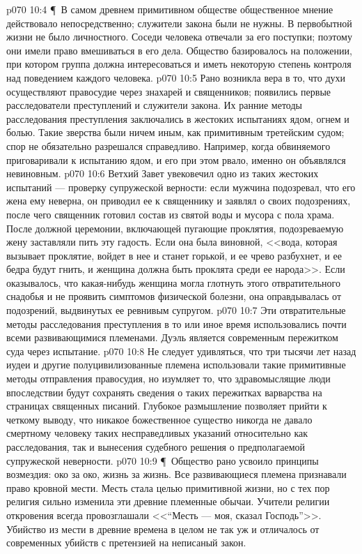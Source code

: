\vs p070 10:4 \P\ В самом древнем примитивном обществе общественное мнение действовало непосредственно; служители закона были не нужны. В первобытной жизни не было личностного. Соседи человека отвечали за его поступки; поэтому они имели право вмешиваться в его дела. Общество базировалось на положении, при котором группа должна интересоваться и иметь некоторую степень контроля над поведением каждого человека.
\vs p070 10:5 Рано возникла вера в то, что духи осуществляют правосудие через знахарей и священников; появились первые расследователи преступлений и служители закона. Их ранние методы расследования преступления заключались в жестоких испытаниях ядом, огнем и болью. Такие зверства были ничем иным, как примитивным третейским судом; спор не обязательно разрешался справедливо. Например, когда обвиняемого приговаривали к испытанию ядом, и его при этом рвало, именно он объявлялся невиновным.
\vs p070 10:6 Ветхий Завет увековечил одно из таких жестоких испытаний --- проверку супружеской верности: если мужчина подозревал, что его жена ему неверна, он приводил ее к священнику и заявлял о своих подозрениях, после чего священник готовил состав из святой воды и мусора с пола храма. После должной церемонии, включающей пугающие проклятия, подозреваемую жену заставляли пить эту гадость. Если она была виновной, <<вода, которая вызывает проклятие, войдет в нее и станет горькой, и ее чрево разбухнет, и ее бедра будут гнить, и женщина должна быть проклята среди ее народа>>. Если оказывалось, что какая\hyp{}нибудь женщина могла глотнуть этого отвратительного снадобья и не проявить симптомов физической болезни, она оправдывалась от подозрений, выдвинутых ее ревнивым супругом.
\vs p070 10:7 Эти отвратительные методы расследования преступления в то или иное время использовались почти всеми развивающимися племенами. Дуэль является современным пережитком суда через испытание.
\vs p070 10:8 Не следует удивляться, что три тысячи лет назад иудеи и другие полуцивилизованные племена использовали такие примитивные методы отправления правосудия, но изумляет то, что здравомыслящие люди впоследствии будут сохранять сведения о таких пережитках варварства на страницах священных писаний. Глубокое размышление позволяет прийти к четкому выводу, что никакое божественное существо никогда не давало смертному человеку таких несправедливых указаний относительно как расследования, так и вынесения судебного решения о предполагаемой супружеской неверности.
\vs p070 10:9 \P\ Общество рано усвоило принципы возмездия: око за око, жизнь за жизнь. Все развивающиеся племена признавали право кровной мести. Месть стала целью примитивной жизни, но с тех пор религия сильно изменила эти древние племенные обычаи. Учители религии откровения всегда провозглашали <<“Месть --- моя, сказал Господь”>>. Убийство из мести в древние времена в целом не так уж и отличалось от современных убийств с претензией на неписаный закон.
